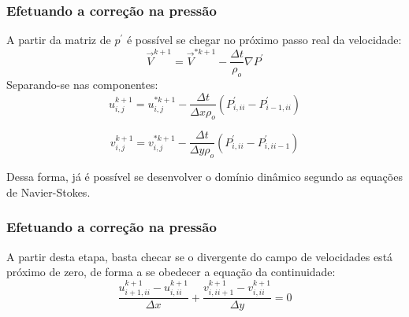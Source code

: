 \documentclass[xcolor=dvipsnames,10pt,aspectratio=169]{beamer}
\begin{document}
	\begin{frame}
		\frametitle{Efetuando a correção na pressão}
		A partir da matriz de $p^\prime$ é possível se chegar no próximo passo real da velocidade:
		\begin{equation}
			\vec{V}^{k+1}  = \vec{V}^{\ast{k + 1}} - \frac{\Delta t}{\rho_o} \nabla P^\prime
		\end{equation}
		Separando-se nas componentes:
		\begin{equation}
			u^{k+1}_{i, j}  = u^{\ast k+1}_{i, j} - \frac{\Delta t}{\Delta x \rho_o} \left(  P^{\prime}_{i , ii} -   P^{\prime}_{i - 1, ii}  \right)
		\end{equation}
		
		\begin{equation}
		v^{k+1}_{i, j}  = v^{\ast k+1}_{i, j} - \frac{\Delta t}{\Delta y \rho_o}  \left(  P^{\prime}_{i , ii} -   P^{\prime}_{i, ii-1}    \right)
		\end{equation}
		
		Dessa forma, já é possível se desenvolver o domínio dinâmico segundo as equações de Navier-Stokes.
		
		
	\end{frame}




	\begin{frame}
		\frametitle{Efetuando a correção na pressão}
		A partir desta etapa, basta checar se o divergente do campo de velocidades está próximo de zero, de forma a se obedecer a equação da continuidade:
		\begin{equation}
		\frac{u_{i + 1 , ii}^{k + 1} - u_{i, ii}^{k + 1} }{\Delta x} + \frac{v_{i , ii + 1}^{k + 1} - v_{i, ii}^{k + 1} }{\Delta y} = 0
		\end{equation}
	
	\end{frame}
\end{document}
